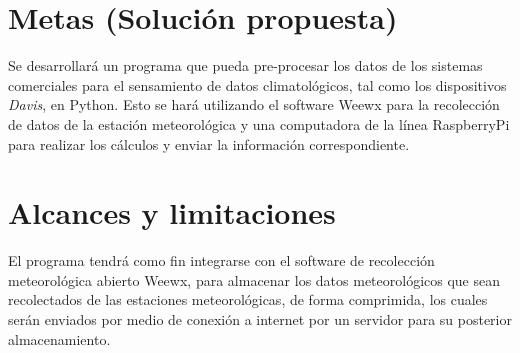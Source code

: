 \section{Metas (Solución propuesta)}

Se desarrollará un programa que pueda pre-procesar los datos de los sistemas comerciales para el sensamiento de datos climatológicos, tal como los dispositivos \textit{Davis}, en Python. Esto se hará utilizando el software Weewx para la recolección de datos de la estación meteorológica y una computadora de la línea RaspberryPi para realizar los cálculos y enviar la información correspondiente.

\section{Alcances y limitaciones}

El programa tendrá como fin integrarse con el software de recolección meteorológica abierto Weewx, para almacenar los datos meteorológicos que sean recolectados de las estaciones meteorológicas, de forma comprimida, los cuales serán enviados por medio de conexión a internet por un servidor para su posterior almacenamiento.

